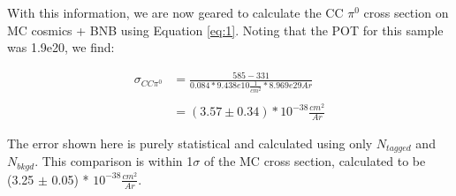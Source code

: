 \documentclass[12pt]{article}
\begin{document}
With this information, we are now geared to calculate the CC $\pi^0$ cross section on MC cosmics + BNB using Equation \ref{eq:1}. Noting that the POT for this sample was 1.9e20, we find:

\begin{align}
\sigma_{CC\pi^0} &= \frac{585 - 331}{0.084 * 9.438e10 \frac{1}{cm^2} * 8.969e29 Ar} \\\\
&= (3.57 \pm 0.34) *10^{-38} \frac{cm^2}{Ar}
\end{align}

The error shown here is purely statistical and calculated using only $N_{tagged}$ and $N_{bkgd}$. This comparison is within 1$\sigma$ of the MC cross section, calculated to be (3.25 $\pm$ 0.05) * $10^{-38} \frac{cm^2}{Ar}$.





\end{document}
